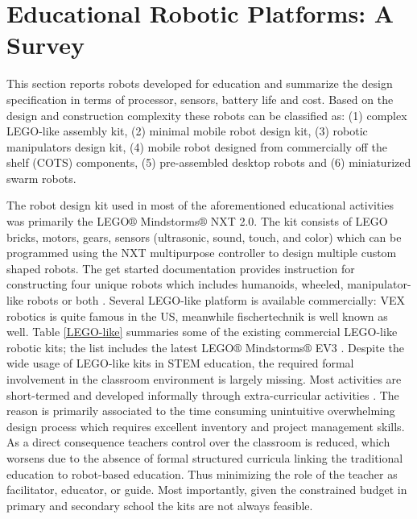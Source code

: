 \documentclass[conference]{IEEEtran}
\begin{document}
\section{Educational Robotic Platforms: A Survey}
This section reports robots developed for education and summarize the design specification in terms 
of processor, sensors, battery life and cost. Based on the design and construction complexity these robots can be 
classified as: (1) complex LEGO-like assembly kit, (2) minimal mobile robot design kit, (3) robotic manipulators 
design kit, (4) mobile robot designed from commercially off the shelf (COTS) components, (5) pre-assembled desktop 
robots and (6) miniaturized swarm robots.

The robot design kit used in most of the aforementioned educational activities was primarily the LEGO$\circledR$ 
Mindstorms$\circledR$ NXT 2.0. The kit consists of LEGO bricks, motors, gears, sensors (ultrasonic, sound, touch, and 
color) which can be programmed using the NXT multipurpose controller to design multiple custom shaped robots. The get 
started documentation provides instruction for constructing four unique robots which includes humanoids, wheeled, 
manipulator-like robots or both \cite{LEGONXT}. Several LEGO-like platform is available commercially: VEX robotics is 
quite famous in the US, meanwhile fischertechnik is well known as well. Table \ref{LEGO-like} summaries some of the 
existing commercial LEGO-like robotic kits; the list includes the latest LEGO$\circledR$ Mindstorms$\circledR$ EV3 
\cite{LEGOEV3}. Despite the wide usage of LEGO-like kits in STEM education, the required formal involvement in the 
classroom environment is largely missing. Most activities are short-termed and developed informally through 
extra-curricular activities \cite{mubin2013review}. The reason is primarily associated to the time consuming unintuitive 
overwhelming design process which requires excellent inventory and project management skills. As a direct consequence 
teachers control over the classroom is reduced, which worsens due to the absence of formal structured curricula linking 
the traditional education to robot-based education. Thus minimizing the role of the teacher as facilitator, educator, 
or guide. Most importantly, given the constrained budget in primary and secondary school the kits are not always 
feasible. 
\end{document}
